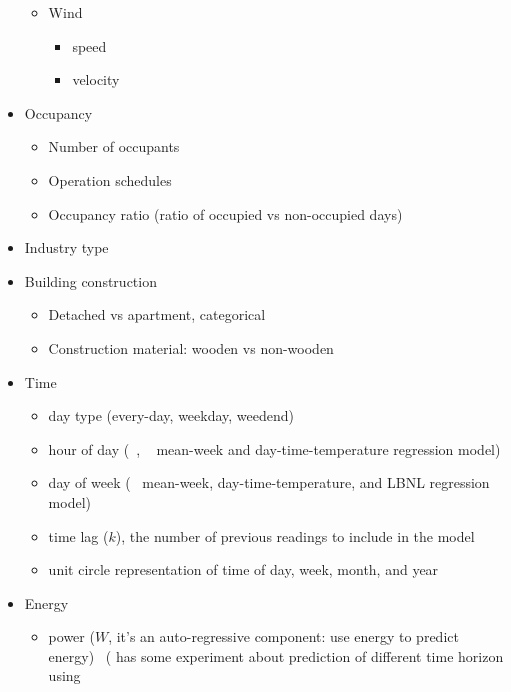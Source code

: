 \documentclass[12pt]{article}
\begin{document}
\begin{itemize}
\begin{itemize}
  \item Wind 
    \begin{itemize}
    \item speed~\cite{mackay1996bayesian}
    \item velocity~\cite{brown2012kernel}
    \end{itemize}
  \end{itemize}
\item Occupancy
  \begin{itemize}
  \item Number of occupants~\cite{Yu20101637}
  \item Operation schedules~\cite{reddy1997baselining}
  \item Occupancy ratio (ratio of occupied vs non-occupied days)~\cite{rabl1992energy}
  \end{itemize}
\item Industry type
\item Building construction
  \begin{itemize}
  \item Detached vs apartment, categorical~\cite{Yu20101637}
  \item Construction material: wooden vs non-wooden~\cite{Yu20101637}
  \end{itemize}
\item Time
  \begin{itemize}
  \item day type (every-day, weekday, weedend)~\cite{haberl1994bin}
  \item hour of day (~\cite{haberl1994bin, wytock2013contextually},
    ~\cite{granderson2014evaluation} mean-week and
    day-time-temperature regression model)
  \item day of week (~\cite{granderson2014evaluation} mean-week, 
    day-time-temperature, and LBNL regression model)
  \item time lag ($k$), the number of previous readings to include in the model~\cite{hammarsten1987critical}
  \item unit circle representation of time of day, week, month, and year~\cite{brown2012kernel}
  \end{itemize}
\item Energy
  \begin{itemize}
  \item power ($W$, it's an auto-regressive component: use energy to
    predict energy)
    ~\cite{hammarsten1987critical}(\cite{mocanu2016deep} has some
    experiment about prediction of different time horizon using

\end{itemize}
\end{itemize}
\end{document}
